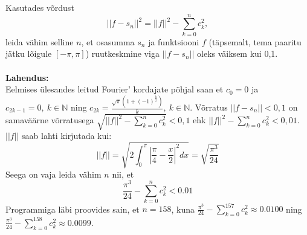 \documentclass{article}
\begin{document}
Kasutades võrdust $$||f-s_n||^2=||f||^2-\sum_{k=0}^nc^2_k,$$leida vähim selline $n$, et osasumma $s_n$ ja funktsiooni $f$ (täpsemalt, tema paaritu jätku lõigule $[-\pi,\pi]$) ruutkeskmine viga $||f-s_n||$ oleks väiksem kui 0,1.\\\\
\textbf{Lahendus:}\\
Eelmises ülesandes leitud Fourier' kordajate põhjal saan et $c_0=0$ ja $c_{2k-1}=0,\ k\in\mathbb{N}$ ning $c_{2k}=\frac{\sqrt{\pi}(1+(-1)^{\frac k2})}{k},\ k\in\mathbb{N}$. Võrratus $||f-s_n||<0,1$ on samaväärne võrratusega $\sqrt{||f||^2-\sum_{k=0}^nc^2_k}<0,1$ ehk $||f||^2-\sum_{k=0}^nc^2_k<0,01$. $||f||$ saab lahti kirjutada kui: $$||f||=\sqrt{2\int_0^{\pi}\left|\frac{\pi}4-\frac x2\right|^2 dx}=\sqrt{\frac{\pi^3}{24}}$$ Seega on vaja leida vähim $n$ nii, et $$\frac{\pi^3}{24}-\sum_{k=0}^nc_k^2<0.01$$ Programmiga läbi proovides sain, et $n=158$, kuna $\frac{\pi^3}{24}-\sum_{k=0}^{157}c_k^2\approx0.0100$ ning $\frac{\pi^3}{24}-\sum_{k=0}^{158}c_k^2\approx0.0099$.
\end{document}
